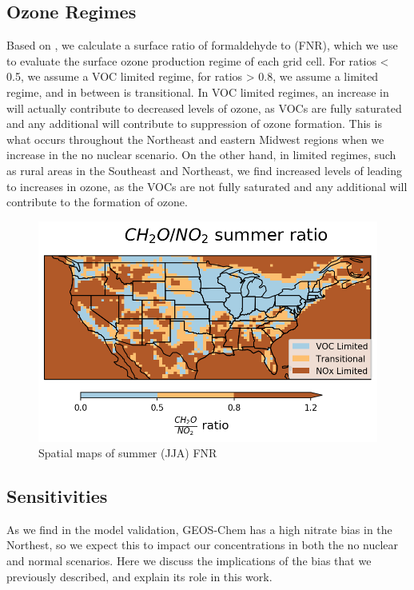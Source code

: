 \documentclass[12]{article}
\begin{document}
\subsection{Ozone Regimes}
Based on \cite{jin_evaluating_2017}, we calculate a surface ratio of formaldehyde to  (FNR), which we use to evaluate the surface ozone production regime of each grid cell. For ratios < 0.5, we assume a VOC limited regime, for ratios > 0.8, we assume a  limited regime, and in between is transitional. In VOC limited regimes, an increase in  will actually contribute to decreased levels of ozone, as VOCs are fully saturated and any additional  will contribute to suppression of ozone formation. This is what occurs throughout the Northeast and eastern Midwest regions when we increase  in the no nuclear scenario. On the other hand, in  limited regimes, such as rural areas in the Southeast and Northeast, we find increased levels of  leading to increases in ozone, as the VOCs are not fully saturated and any additional  will contribute to the formation of ozone.  

\begin{figure}
    \centering
    \includegraphics[scale=0.4]{ego_nonuclear_project/Figures/summer_regime_national_ratio.png}
    \caption{Spatial maps of summer (JJA) FNR} 
    \label{fig:summer_FNR}
\end{figure}
\subsection{ Sensitivities}
As we find in the model validation, GEOS-Chem has a high nitrate bias in the Northest, so we expect this to impact our  concentrations in both the no nuclear and normal scenarios. Here we discuss the implications of the bias that we previously described, and explain its role in this work.
\end{document}
